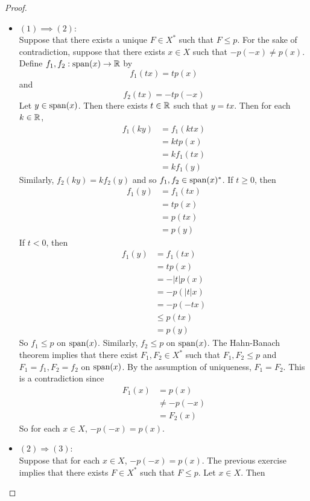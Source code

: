 \documentclass{book}
\begin{document}
	\begin{proof} \
		\begin{itemize}
			\item $(1) \implies (2)$: \\ 
			Suppose that there exists a unique $F \in X^*$ such that $F \leq p$. For the sake of contradiction, suppose that there exists $x \in X$ such that $-p(-x) \neq p(x)$. Define $f_1,f_2: \operatorname{span}(x) \rightarrow \mathbb{R}$ by $$f_1(tx) = t p(x)$$ and $$f_2(tx) = -tp(-x)$$ Let $y \in \operatorname{span}(x)$. Then there exists $t \in \mathbb{R}$ such that $y = tx$. Then for each $k \in \mathbb{R}$,
			\begin{align*}
				f_1(ky)
				&= f_1(ktx) \\
				&= ktp(x) \\
				&= k f_1(tx) \\
				&= k f_1(y)
			\end{align*}
			Similarly, $f_2(ky) = kf_2(y)$ and so $f_1, f_2 \in \operatorname{span}(x)^*$. 
			If $t \geq 0$, then 
			\begin{align*}
				f_1(y) 
				&= f_1(tx) \\
				&= tp(x) \\
				&= p(tx) \\
				&= p(y) 
			\end{align*}
			If $t <0$, then 	
			\begin{align*}
				f_1(y) 
				&= f_1(tx) \\
				&= tp(x) \\
				&= -|t|p(x) \\
				&= -p(|t|x) \\
				&= -p(-tx) \\
				& \leq p(tx) \\
				&= p(y)  
			\end{align*}
			So $f_1 \leq p$ on $\operatorname{span}(x)$. Similarly, $f_2 \leq p$ on $\operatorname{span}(x)$. The Hahn-Banach theorem implies that there exist $F_1, F_2 \in X^*$ such that $F_1, F_2 \leq p$ and $F_1 = f_1, F_2 = f_2$ on $\operatorname{span}(x)$. By the assumption of uniqueness, $F_1 = F_2$. This is a contradiction since 
			\begin{align*}
				F_1(x) 
				&= p(x) \\
				& \neq -p(-x) \\
				& = F_2(x) 
			\end{align*}		
			So for each $x \in X$, $-p(-x) = p(x)$. 
			\item $(2) \Rightarrow (3)$: \\
			Suppose that for each $x \in X$, $-p(-x) = p(x)$. The previous exercise implies that there exists $F \in X^*$ such that $F \leq p$. Let $x \in X$. Then 

\end{itemize}
\end{proof}
\end{document}
